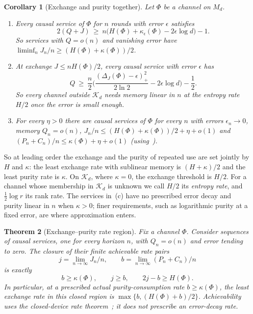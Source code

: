 \documentclass[11pt,a4paper]{article}
\theoremstyle{plain}
\newtheorem{theorem}{Theorem}[section]
\newtheorem{corollary}[theorem]{Corollary}
\theoremstyle{definition}
\theoremstyle{remark}
\begin{document}
\begin{corollary}[Exchange and purity together]\label{cor:exchange-purity}
Let $\Phi$ be a channel on $M_d$.
\begin{enumerate}[label=(\alph*)]
\item Every causal service of $\Phi$ for $n$ rounds with error $\epsilon$ satisfies
\[
2(Q+J)\ \ge\ n\big(H(\Phi)+\kappa_\epsilon(\Phi)-2\epsilon\log d\big)-1 .
\]
So services with $Q=o(n)$ and vanishing error have $\liminf_nJ_n/n\ge(H(\Phi)+\kappa(\Phi))/2$.
\item At exchange $J\le nH(\Phi)/2$, every causal service with error $\epsilon$ has
\[
Q\ \ge\ \frac n2\Big(\frac{(\Delta_J(\Phi)-\epsilon)_+^2}{2\ln2}-2\epsilon\log d\Big)-\frac12 .
\]
So every channel outside $\mathcal K_d$ needs memory linear in $n$ at the entropy rate $H/2$ once the error is small enough.
\item For every $\eta>0$ there are causal services of $\Phi$ for every $n$ with errors $\epsilon_n\to0$, memory $Q_n=o(n)$,
$J_n/n\le(H(\Phi)+\kappa(\Phi))/2+\eta+o(1)$ and $(P_n+C_n)/n\le\kappa(\Phi)+\eta+o(1)$
(using~\cite[Theorem~2.1]{Douglas2026closed}).
\end{enumerate}
\end{corollary}

So at leading order the exchange and the purity of repeated use are set jointly by $H$ and $\kappa$: the least exchange rate with sublinear
memory is $(H+\kappa)/2$ and the least purity rate is $\kappa$. On $\mathcal K_d$, where $\kappa=0$, the exchange threshold is $H/2$. For a channel
whose membership in $\mathcal K_d$ is unknown we call $H/2$ its \emph{entropy rate}, and $\frac12\log r$ its rank rate. The services in~(c) have no
prescribed error decay and purity linear in $n$ when $\kappa>0$; finer requirements, such as logarithmic purity at a fixed error, are where
approximation enters.

\begin{theorem}[Exchange--purity rate region]\label{thm:rate-region}
Fix a channel $\Phi$. Consider sequences of causal services, one for every horizon $n$, with $Q_n=o(n)$ and error tending to zero.
The closure of their finite achievable rate pairs
\[
j=\lim_{n\to\infty}J_n/n,\qquad b=\lim_{n\to\infty}(P_n+C_n)/n
\]
is exactly
\[
\boxed{\quad b\ge\kappa(\Phi),\qquad j\ge b,\qquad 2j-b\ge H(\Phi).\quad}
\]
In particular, at a prescribed actual purity-consumption rate $b\ge\kappa(\Phi)$, the least exchange rate in this closed region is
$\max\{b,(H(\Phi)+b)/2\}$. Achievability uses the closed-device rate theorem~\cite[Theorem~2.1]{Douglas2026closed}; it does not prescribe an error-decay rate.
\end{theorem}
\end{document}
